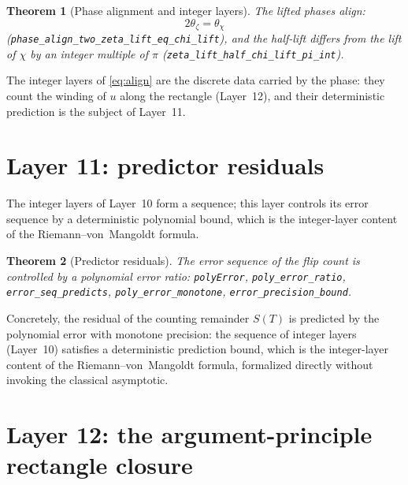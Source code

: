 \documentclass{article}
\newtheorem{theorem}{Theorem}[section]
\newcommand{\zt}{\zeta}
\newcommand{\Xchi}{\chi}
\begin{document}
\begin{theorem}[Phase alignment and integer layers]
\label{thm:align}
The lifted phases align:
\begin{equation}
\label{eq:align}
2\theta_{\zt}=\theta_{\Xchi}
\end{equation}
(\texttt{phase\_align\_two\_zeta\_lift\_eq\_chi\_lift}), and the half-lift
differs from the lift of $\Xchi$ by an integer multiple of $\pi$
(\texttt{zeta\_lift\_half\_chi\_lift\_pi\_int}).
\end{theorem}

The integer layers of \eqref{eq:align} are the discrete data carried by the
phase: they count the winding of $u$ along the rectangle (Layer~12), and
their deterministic prediction is the subject of Layer~11.

\section{Layer 11: predictor residuals}
\label{sec:L11}

The integer layers of Layer~10 form a sequence; this layer controls its
error sequence by a deterministic polynomial bound, which is the
integer-layer content of the Riemann--von~Mangoldt formula.

\begin{theorem}[Predictor residuals]
\label{thm:residual}
The error sequence of the flip count is controlled by a polynomial error
ratio: \texttt{polyError}, \texttt{poly\_error\_ratio},
\texttt{error\_seq\_predicts}, \texttt{poly\_error\_monotone},
\texttt{error\_precision\_bound}.
\end{theorem}

Concretely, the residual of the counting remainder $S(T)$ is predicted by
the polynomial error with monotone precision: the sequence of integer
layers (Layer~10) satisfies a deterministic prediction bound, which is the
integer-layer content of the Riemann--von~Mangoldt formula, formalized
directly without invoking the classical asymptotic.

\section{Layer 12: the argument-principle rectangle closure}
\label{sec:L12}
\end{document}
